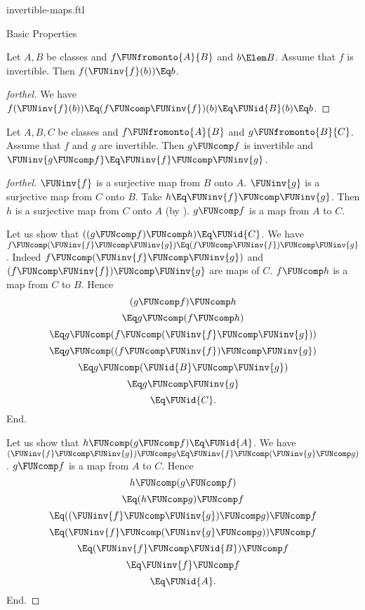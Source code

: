 \documentclass{stex}
\begin{document}
\begin{smodule}{invertible-maps.ftl}
\begin{sfragment}{Basic Properties}
  \begin{proposition}[forthel]
    Let $A, B$ be classes and $f \FUNfromonto{A}{B}$ and $b \Elem B$.
    Assume that $f$ is invertible.
    Then $f(\FUNinv{f}(b)) \Eq b$.
  \end{proposition}
  \begin{proof}[forthel]
    We have
    $f(\FUNinv{f}(b))
      \Eq (f \FUNcomp \FUNinv{f})(b)
      \Eq \FUNid{B}(b)
      \Eq b$.
  \end{proof}


  \begin{proposition}[forthel,name=invertibility of composition of invertible maps]
    Let $A, B, C$ be classes and $f \FUNfromonto{A}{B}$ and $g \FUNfromonto{B}{C}$.
    Assume that $f$ and $g$ are invertible.
    Then $g \FUNcomp f$ is invertible and $\FUNinv{g \FUNcomp f} \Eq \FUNinv{f} \FUNcomp \FUNinv{g}$.
  \end{proposition}
  \begin{proof}[forthel]
    $\FUNinv{f}$ is a surjective map from $B$ onto $A$.
    $\FUNinv{g}$ is a surjective map from $C$ onto $B$.
    Take $h \Eq \FUNinv{f} \FUNcomp \FUNinv{g}$.
    Then $h$ is a surjective map from $C$ onto $A$ (by ).
    $g \FUNcomp f$ is a map from $A$ to $C$.

    Let us show that $((g \FUNcomp f) \FUNcomp h) \Eq \FUNid{C}$.
      We have $f \FUNcomp (\FUNinv{f} \FUNcomp \FUNinv{g}) \Eq (f \FUNcomp \FUNinv{f}) \FUNcomp \FUNinv{g}$.
      Indeed $f \FUNcomp (\FUNinv{f} \FUNcomp \FUNinv{g})$ and $(f \FUNcomp \FUNinv{f}) \FUNcomp \FUNinv{g}$ are maps of $C$.
      $f \FUNcomp h$ is a map from $C$ to $B$.
      Hence
      \[  (g \FUNcomp f) \FUNcomp h                           \]
      \[    \Eq g \FUNcomp (f \FUNcomp h)                       \]
      \[    \Eq g \FUNcomp (f \FUNcomp (\FUNinv{f} \FUNcomp \FUNinv{g}))   \]
      \[    \Eq g \FUNcomp ((f \FUNcomp \FUNinv{f}) \FUNcomp \FUNinv{g})   \]
      \[    \Eq g \FUNcomp (\FUNid{B} \FUNcomp \FUNinv{g})            \]
      \[    \Eq g \FUNcomp \FUNinv{g}                            \]
      \[    \Eq \FUNid{C}.                                  \]
    End.

    Let us show that $h \FUNcomp (g \FUNcomp f) \Eq \FUNid{A}$.
      We have $(\FUNinv{f} \FUNcomp \FUNinv{g}) \FUNcomp g \Eq \FUNinv{f} \FUNcomp (\FUNinv{g} \FUNcomp g)$.
      $g \FUNcomp f$ is a map from $A$ to $C$.
      Hence
      \[  h \FUNcomp (g \FUNcomp f)                           \]
      \[    \Eq (h \FUNcomp g) \FUNcomp f                       \]
      \[    \Eq ((\FUNinv{f} \FUNcomp \FUNinv{g}) \FUNcomp g) \FUNcomp f   \]
      \[    \Eq (\FUNinv{f} \FUNcomp (\FUNinv{g} \FUNcomp g)) \FUNcomp f   \]
      \[    \Eq (\FUNinv{f} \FUNcomp \FUNid{B}) \FUNcomp f            \]
      \[    \Eq \FUNinv{f} \FUNcomp f                            \]
      \[    \Eq \FUNid{A}.                                  \]
    End.


\end{proof}
\end{sfragment}
\end{smodule}
\end{document}
